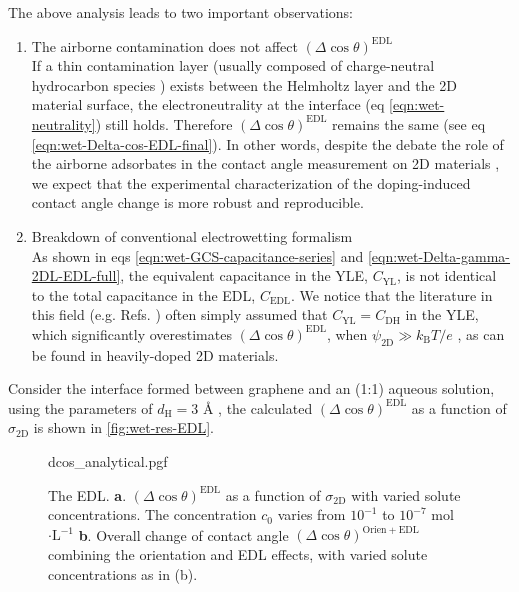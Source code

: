 The above analysis leads to two important observations:
\begin{enumerate}
\item The airborne contamination does not affect \((\Delta \cos
  \theta)^{\mathrm{EDL}}\) \\
  If a thin
contamination layer (usually composed of charge-neutral hydrocarbon
species \cite{li_2013_airborne}) exists between the Helmholtz layer and
the 2D material surface, the electroneutrality at the interface (eq
\autoref{eqn:wet-neutrality}) still holds. Therefore \((\Delta \cos
\theta)^{\mathrm{EDL}}\) remains the same (see eq
\autoref{eqn:wet-Delta-cos-EDL-final}). In other words, despite the
debate the role of the airborne adsorbates in the contact angle
measurement on 2D materials
\cite{li_2013_airborne,Kozbial_2015_wetting_mos2,Xu_2013_withwhat,Chow_2015_wetting_WS2}, we expect
that the experimental characterization of the doping-induced contact
angle change is more robust and reproducible.

\item Breakdown of conventional electrowetting formalism \\
  As shown in eqs
\autoref{eqn:wet-GCS-capacitance-series} and \autoref{eqn:wet-Delta-gamma-2DL-EDL-full},
the equivalent capacitance in the YLE, \(C_{\mathrm{YL}}\), is not
identical to the total capacitance in the EDL, \(C_{\mathrm{EDL}}\). We
notice that the literature in this field (e.g. Refs.
\cite{Ostrowski_2014_tunable,Daub_2007_nanoscale_EW,goniszewski_correlation_2016,Ashraf_2016_doping})
often simply assumed that \(C_{\mathrm{YL}}=C_{\mathrm{DH}}\) in the
YLE, which significantly overestimates \((\Delta \cos
\theta)^{\mathrm{EDL}}\), when \(\psi_{\mathrm{2D}} \gg
k_{\mathrm{B}}T/e\) \cite{Israelachvili_2011_book}, as can be found in heavily-doped 2D materials. 
\end{enumerate}

Consider the interface formed between graphene and an (1:1) aqueous
solution, using the parameters of \(d_{\mathrm{H}}=3\) Å
\cite{Mcclendon_1927_helmholtz_EDL},
the calculated \((\Delta \cos \theta)^{\mathrm{EDL}}\) as a function
of \(\sigma_{\mathrm{2D}}\) is shown in \autoref{fig:wet-res-EDL}.
%
\begin{figure}[!htbp]
  \centering
  {dcos_analytical.pgf}
  \caption{\label{fig:wet-res-EDL} The EDL. \textbf{a}.
    \((\Delta\cos\theta)^{\mathrm{EDL}}\) as a function of
    \(\sigma_{\mathrm{2D}}\) with varied solute concentrations. The
    concentration \(c_{0}\) varies from \(10^{-1}\) to \(10^{-7}\)
    mol\(\cdot\mathrm{L}^{-1}\) \textbf{b}. Overall change of contact
    angle \((\Delta \cos \theta)^{\mathrm{Orien+EDL}}\) combining the
    orientation and EDL effects, with varied solute concentrations as
    in (b).}
\end{figure}


